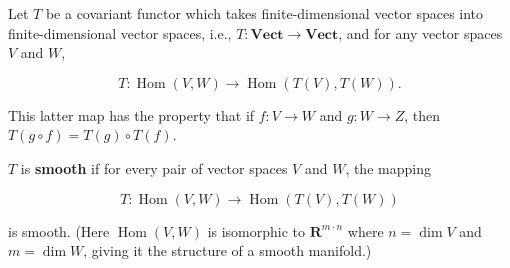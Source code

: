 Let $T$ be a covariant functor which takes finite-dimensional vector spaces into finite-dimensional vector spaces, i.e., $T: \mathbf{Vect} \rightarrow \mathbf{Vect}$, and for any vector spaces $V$ and $W$,

$$T: \operatorname{Hom}(V, W) \rightarrow \operatorname{Hom}(T(V), T(W)).$$

This latter map has the property that if $f: V \rightarrow W$ and $g: W \rightarrow Z$, then $T(g \circ f) = T(g) \circ T(f)$.

$T$ is \textbf{smooth} if for every pair of vector spaces $V$ and $W$, the mapping

$$T: \operatorname{Hom}(V, W) \rightarrow \operatorname{Hom}(T(V), T(W))$$

is smooth. (Here $\operatorname{Hom}(V, W)$ is isomorphic to $\mathbf{R}^{m \cdot n}$ where $n = \dim V$ and $m = \dim W$, giving it the structure of a smooth manifold.)
